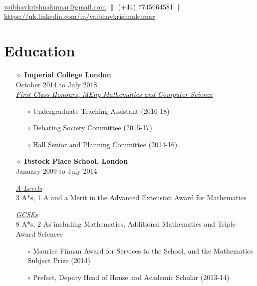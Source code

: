 \documentclass[a4paper]{article}
\begin{document}

{} \\
\href{mailto:vaibhavkrishnakumar@gmail.com} {vaibhavkrishnakumar@gmail.com} \hspace{10pt} $\parallel$ \hspace{10pt} (+44) 7745664581 \hspace{10pt} $\parallel$ \hspace{10pt} \href{https://uk.linkedin.com/in/vaibhavkrishnakumar} {https://uk.linkedin.com/in/vaibhavkrishnakumar}

\vspace{-12pt}
\section*{Education}
\vspace{-7pt}

\begin{itemize}

\item[$\diamond$] \textbf{Imperial College London} \\
	October 2014 to July 2018	\\
	\textit{\underline{First Class Honours, MEng Mathematics and Computer Science}}
\begin{itemize}
\item[$\circ$] Undergraduate Teaching Assistant (2016-18)
\item[$\circ$] Debating Society Committee (2015-17)
\item[$\circ$] Hall Senior and Planning Committee (2014-16)
\end{itemize}

\item[$\diamond$] \textbf{Ibstock Place School, London} \\
	January 2009 to July 2014

\textit{\underline{A-Levels}} \\
3 A*s, 1 A and a Merit in the Advanced Extension Award for Mathematics

\textit{\underline{GCSEs}} \\
	8 A*s, 2 As including Mathematics, Additional Mathematics and Triple Award Sciences

\begin{itemize}
\item[$\circ$] Maurice Finnan Award for Services to the School, and the Mathematics Subject Prize (2014)
\item[$\circ$] Prefect, Deputy Head of House and Academic Scholar (2013-14)
\end{itemize}	

\end{itemize}
\end{document}
